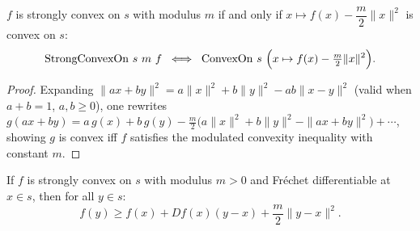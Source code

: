 \begin{lemma}\label{lem:strongConvexOn_iff_convex}
  \leanok{}
  \uses{}
  $f$ is strongly convex on $s$ with modulus $m$ if and only if
  $x \mapsto f(x) - \dfrac{m}{2}\|x\|^2$ is convex on $s$:
  \[
    \mathrm{StrongConvexOn}\ s\ m\ f
    \;\iff\;
    \mathrm{ConvexOn}\ s\ \Bigl(x \mapsto f(x) - \tfrac{m}{2}\|x\|^2\Bigr).
  \]
\end{lemma}
\begin{proof}
  \leanok{}
  Expanding $\|ax+by\|^2 = a\|x\|^2+b\|y\|^2 - ab\|x-y\|^2$ (valid when $a+b=1$, $a,b\ge0$),
  one rewrites
  \(g(ax+by) = a\,g(x) + b\,g(y) - \tfrac{m}{2}\bigl(a\|x\|^2 + b\|y\|^2 - \|ax+by\|^2\bigr)
    + \cdots\),
  showing $g$ is convex iff $f$ satisfies the modulated convexity inequality with constant $m$.
\end{proof}


\begin{lemma}\label{lem:strong_convex_lower_bound}
  \leanok{}
  If $f$ is strongly convex on $s$ with modulus $m > 0$ and Fr\'echet differentiable at $x \in s$,
  then for all $y \in s$:
  \[
    f(y) \ge f(x) + Df(x)(y - x) + \frac{m}{2}\|y - x\|^2.
  \]
\end{lemma}

